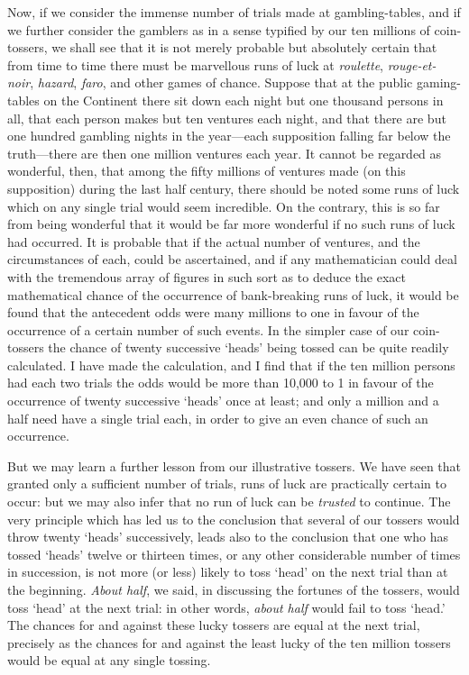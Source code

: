 \documentclass[letterpaper,12pt,oneside,openany]{memoir}
\begin{document}
Now, if we consider the immense number of trials
made at gambling-tables, and if we further consider
the gamblers as in a sense typified by our ten millions
of coin-tossers, we shall see that it is not merely
probable but absolutely certain that from time to
time there must be marvellous runs of luck at \textit{roulette},
\textit{rouge-et-noir}, \textit{hazard}, \textit{faro}, and other games of
chance. Suppose that at the public gaming-tables on
the Continent there sit down each night but one
thousand persons in all, that each person makes but
ten ventures each night, and that there are but one
hundred gambling nights in the year---each supposition
falling far below the truth---there are then one
million ventures each year. It cannot be regarded as
wonderful, then, that among the fifty millions of
ventures made (on this supposition) during the last
half century, there should be noted some runs of luck
which on any single trial would seem incredible. On
the contrary, this is so far from being wonderful that
it would be far more wonderful if no such runs of luck
had occurred. It is probable that if the actual number
of ventures, and the circumstances of each, could be
ascertained, and if any mathematician could deal with
the tremendous array of figures in such sort as to
deduce the exact mathematical chance of the occurrence
of bank-breaking runs of luck, it would be found
that the antecedent odds were many millions to one in
favour of the occurrence of a certain number of such
events. In the simpler case of our coin-tossers the
chance of twenty successive `heads' being tossed can
be quite readily calculated. I have made the calculation,
and I find that if the ten million persons had
each two trials the odds would be more than 10,000
to 1 in favour of the occurrence of twenty successive
`heads' once at least; and only a million and a half
need have a single trial each, in order to give an even
chance of such an occurrence.

But we may learn a further lesson from our illustrative
tossers. We have seen that granted only a
sufficient number of trials, runs of luck are practically
certain to occur: but we may also infer that no run of
luck can be \textit{trusted} to continue. The very principle
which has led us to the conclusion that several of our
tossers would throw twenty `heads' successively, leads
also to the conclusion that one who has tossed `heads'
twelve or thirteen times, or any other considerable
number of times in succession, is not more (or less)
likely to toss `head' on the next trial than at the
beginning. \textit{About half}, we said, in discussing the
fortunes of the tossers, would toss `head' at the next
trial: in other words, \textit{about half} would fail to toss
`head.' The chances for and against these lucky
tossers are equal at the next trial, precisely as the
chances for and against the least lucky of the ten
million tossers would be equal at any single tossing.
\end{document}
